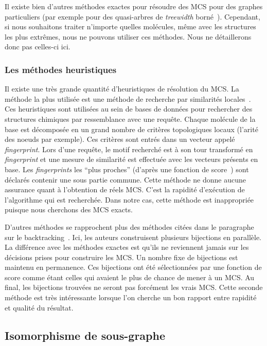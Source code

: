Il existe bien d'autres méthodes exactes pour résoudre des MCS pour des graphes particuliers (par exemple pour des quasi-arbres de \textit{treewidth} borné~\cite{yamaguchi_finding_2004}).
Cependant, si nous souhaitons traiter n'importe quelles molécules, même avec les structures les plus extrêmes, nous ne pouvons utiliser ces méthodes.
Nous ne détaillerons donc pas celles-ci ici.


\subsubsection{Les méthodes heuristiques}

Il existe une très grande quantité d'heuristiques de résolution du MCS.
La méthode la plus utilisée est une méthode de recherche par similarités locales~\cite{yan_substructure_2005,willett_similarity_2011}.
Ces heuristiques sont utilisées au sein de bases de données pour rechercher des structures chimiques par ressemblance avec une requête.
Chaque molécule de la base est décomposée en un grand nombre de critères topologiques locaux (l'arité des noeuds par exemple).
Ces critères sont entrés dans un vecteur appelé \textit{fingerprint}.
Lors d'une requête, le motif recherché est à son tour transformé en \textit{fingerprint} et une mesure de similarité est effectuée avec les vecteurs présents en base.
Les \textit{fingerprints} les ``plus proches'' (d'après une fonction de score~\cite{maggiora_molecular_2011,ndiaye_cp_2011}) sont déclarés contenir une sous partie commune.
Cette méthode ne donne aucune assurance quant à l'obtention de réels MCS.
C'est la rapidité d'exécution de l'algorithme qui est recherchée.
Dans notre cas, cette méthode est inappropriée puisque nous cherchons des MCS exacts.

D'autres méthodes se rapprochent plus des méthodes citées dans le paragraphe sur le backtracking~\cite{grosso_simple_2008, wang_fmcsr:_2013}.
Ici, les auteurs construisent plusieurs bijections en parallèle.
La différence avec les méthodes exactes est qu'ils ne reviennent jamais sur les décisions prises pour construire les MCS.
Un nombre fixe de bijections est maintenu en permanence.
Ces bijections ont été sélectionnées par une fonction de score comme étant celles qui avaient le plus de chance de mener à un MCS.
Au final, les bijections trouvées ne seront pas forcément les vrais MCS.
Cette seconde méthode est très intéressante lorsque l'on cherche un bon rapport entre rapidité et qualité du résultat.


\subsection{Isomorphisme de sous-graphe}

